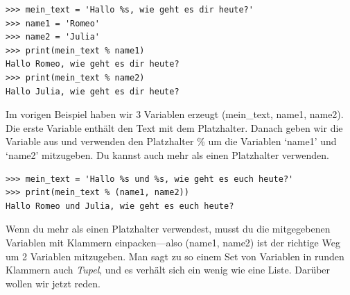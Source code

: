 \begin{Verbatim}[frame=single]
>>> mein_text = 'Hallo %s, wie geht es dir heute?'
>>> name1 = 'Romeo'
>>> name2 = 'Julia'
>>> print(mein_text % name1)
Hallo Romeo, wie geht es dir heute?
>>> print(mein_text % name2)
Hallo Julia, wie geht es dir heute?
\end{Verbatim}

Im vorigen Beispiel haben wir 3 Variablen erzeugt (mein\_text, name1, name2). Die erste Variable enthält den Text mit dem Platzhalter. Danach geben wir die Variable aus und verwenden den Platzhalter \% um die Variablen `name1' und `name2' mitzugeben. Du kannst auch mehr als einen Platzhalter verwenden.

\begin{Verbatim}[frame=single]
>>> mein_text = 'Hallo %s und %s, wie geht es euch heute?'
>>> print(mein_text % (name1, name2))
Hallo Romeo und Julia, wie geht es euch heute?
\end{Verbatim}

Wenn du mehr als einen Platzhalter verwendest, musst du die mitgegebenen Variablen mit Klammern einpacken---also (name1, name2) ist der richtige Weg um 2 Variablen mitzugeben. Man sagt zu so einem Set von Variablen in runden Klammern auch \emph{Tupel}, und es verhält sich ein wenig wie eine Liste. Darüber wollen wir jetzt reden.

